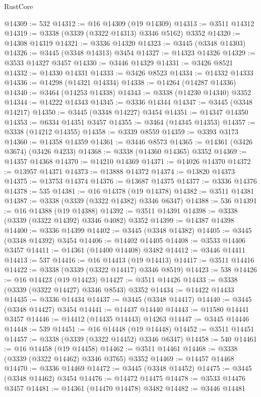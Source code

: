 \begin{lexlean}{RustCore}
\begin{coremodule}
@14309 := 532
@14312 := @16 @14309 (@19 @14309)
@14313 := @3511 @14312
@14319 := @3338 (@3339 (@3322 @14313) @3346 @5162) @3352
@14320 := @14308 @14319
@14321 := @3336 @14320
@14323 := @3445 (@3348 @14303)
@14326 := @3445 (@3348 @14313) @3454
@14327 := @14323 @14326
@14329 := @3533 @14327 @3457
@14330 := @3446 @14329
@14331 := @3426 @8521
@14332 := @14330 @14331
@14333 := @3426 @8523
@14334 := @14332 @14333
@14336 := @14298 (@14321 @14334)
@14338 := @14264 (@14287 @14336)
@14340 := @3464 (@14253 @14338)
@14343 := @3338 (@14230 @14340) @3352
@14344 := @14222 @14343
@14345 := @3336 @14344
@14347 := @3445 (@3348 @14217)
@14350 := @3445 (@3348 @14227) @3454
@14351 := @14347 @14350
@14353 := @6334 @14351 @3457
@14355 := @3464 (@14345 @14353)
@14357 := @3338 (@14212 @14355)
@14358 := @3339 @8559
@14359 := @3393 @3173
@14360 := @14358 @14359
@14361 := @3446 @8573
@14365 := @14361 (@3426 @3674) (@3426 @4233)
@14368 := @3338 (@14360 @14365) @3352
@14369 := @14357 @14368
@14370 := @14210 @14369
@14371 := @14026 @14370
@14372 := @13957 @14371
@14373 := @13888 @14372
@14374 := @13820 @14373
@14375 := @13753 @14374
@14376 := @13687 @14375
@14377 := @3336 @14376
@14378 := 535
@14381 := @16 @14378 (@19 @14378)
@14382 := @3511 @14381
@14387 := @3338 (@3339 (@3322 @14382) @3346 @6347)
@14388 := 536
@14391 := @16 @14388 (@19 @14388)
@14392 := @3511 @14391
@14398 := @3338 (@3339 (@3322 @14392) @3346 @4082) @3352
@14399 := @14387 @14398
@14400 := @3336 @14399
@14402 := @3445 (@3348 @14382)
@14405 := @3445 (@3348 @14392) @3454
@14406 := @14402 @14405
@14408 := @3533 @14406 @3457
@14411 := @14361 (@14400 @14408) @3482
@14412 := @3446 @14411
@14413 := 537
@14416 := @16 @14413 (@19 @14413)
@14417 := @3511 @14416
@14422 := @3338 (@3339 (@3322 @14417) @3346 @8519)
@14423 := 538
@14426 := @16 @14423 (@19 @14423)
@14427 := @3511 @14426
@14433 := @3338 (@3339 (@3322 @14427) @3346 @8543) @3352
@14434 := @14422 @14433
@14435 := @3336 @14434
@14437 := @3445 (@3348 @14417)
@14440 := @3445 (@3348 @14427) @3454
@14441 := @14437 @14440
@14443 := @11580 @14441 @3457
@14446 := @14412 (@14435 @14443) @14263
@14447 := @3445 @14446
@14448 := 539
@14451 := @16 @14448 (@19 @14448)
@14452 := @3511 @14451
@14457 := @3338 (@3339 (@3322 @14452) @3346 @6347)
@14458 := 540
@14461 := @16 @14458 (@19 @14458)
@14462 := @3511 @14461
@14468 := @3338 (@3339 (@3322 @14462) @3346 @3765) @3352
@14469 := @14457 @14468
@14470 := @3336 @14469
@14472 := @3445 (@3348 @14452)
@14475 := @3445 (@3348 @14462) @3454
@14476 := @14472 @14475
@14478 := @3533 @14476 @3457
@14481 := @14361 (@14470 @14478) @3482
@14482 := @3446 @14481

\end{coremodule}
\end{lexlean}
